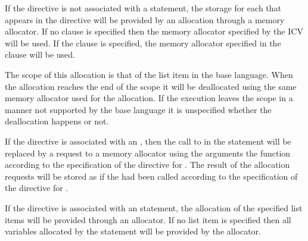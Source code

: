 \descr

If the directive is not associated with a statement, the storage for each  that appears in the directive will be provided by an allocation through a memory allocator. If no clause is specified then the memory allocator specified by the  ICV will be used. If the  clause is specified, the memory allocator specified in the clause will be used.

The scope of this allocation is that of the list item in the base language. When the allocation reaches the end of the scope it will be deallocated using the same memory allocator used for the allocation. If the execution leaves the scope in a manner not supported by the base language it is unspecified whether the deallocation happens or not.

\begin{ccppspecific}
If the directive is associated with an , then the call to  in the statement will be replaced by a request to a memory allocator using the arguments the function according to the specification of the  directive for . The result of the allocation requests will be stored as if the  had been called according to the specification of the  directive for .
\end{ccppspecific}

\begin{fortranspecific}
If the directive is associated with an  statement, the allocation of the specified list items will be provided through an allocator. If no list item is specified then all variables allocated by the  statement will be provided by the allocator.
\end{fortranspecific}

